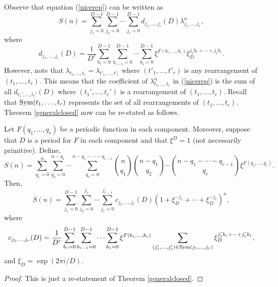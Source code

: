 Observe that equation (\ref{nicerep}) can be written as 
\begin{equation}
 S(n)=\sum_{j_1=0}^{D-1}\sum_{j_2=0}^{D-1}\cdots \sum_{j_r=0}^{D-1}
 d_{j_1,\ldots, j_r}(D)\lambda_{j_1,\ldots,j_r}^n,
\end{equation}
where
\begin{equation}
 d_{j_1,\ldots, j_r}(D)=\frac{1}{D^r}\sum_{b_r=0}^{D-1}\sum_{b_{r-1}=0}^{D-1}\cdots \sum_{b_1=0}^{D-1}  \xi^{F(b_1,\ldots,b_r)}\xi_D^{j_1b_r+\cdots+j_rb_1}.
\end{equation}
However, note that $\lambda_{t_1,\ldots, t_r}=\lambda_{t'_1,\ldots, t'_r}$ where $(t'_1,\ldots, t'_r)$ is any rearrangement of $(t_1,\ldots, t_r)$.  This means that the coefficient of 
$\lambda^n_{t_1,\ldots,t_r}$ in (\ref{nicerep}) is the sum of all $d_{t_1',\ldots,t_r'}(D)$ where $(t_1',\ldots,t_r')$ is a rearrangement of $(t_1,\ldots,t_r)$.
Recall that $\mathrm{Sym}(t_1,\ldots,t_r)$ represents the set 
of all rearrangements of $(t_1,\ldots, t_r)$.  Theorem \ref{generalclosed} now can be re-stated as follows.

\begin{theorem}
\label{generalclosedA}
Let $F(q_1,\ldots,q_r)$ be a periodic function in each component.  Moreover, suppose that $D$ is a period for $F$ in each component and that $\xi^D=1$ (not necessarily primitive).  Define,
\begin{equation}
\label{gensumA}
S(n)=\sum_{q_1=0}^n\sum_{q_2=0}^{n-q_1}\cdots\sum_{q_r=0}^{n-q_1-\cdots-q_{r-1}} \binom{n}{q_1}\binom{n-q_1}{q_2}\cdots\binom{n-q_1-\cdots -q_{r-1}}{q_r}\xi^{F(q_1,\ldots,q_r)}. 
\end{equation}
Then,
\begin{equation}
 S(n)=\sum_{j_1=0}^{D-1}\sum_{j_2=0}^{j_1}\cdots \sum_{j_r=0}^{j_{r-1}}c_{j_1,\ldots,j_r}(D)\left(1+\xi_D^{-j_1}+\cdots+\xi_D^{-j_r}\right)^n,%
\end{equation}
where  
\begin{equation}
 c_{j_1,\ldots, j_r}(D)=\frac{1}{D^r}\sum_{b_r=0}^{D-1}\sum_{b_{r-1}=0}^{D-1}\cdots \sum_{b_1=0}^{D-1}  \xi^{F(b_1,\ldots,b_r)}\sum_{(j_1',\ldots,j_r')\in \mathrm{Sym}(j_1,\ldots, j_r)}
 \xi_D^{j_1'b_r+\cdots+j_r' b_1},
\end{equation}
and $\xi_D=\exp(2\pi i/D)$.%
\end{theorem}
\begin{proof}
 This is just a re-statement of Theorem \ref{generalclosed}.
\end{proof}
 

